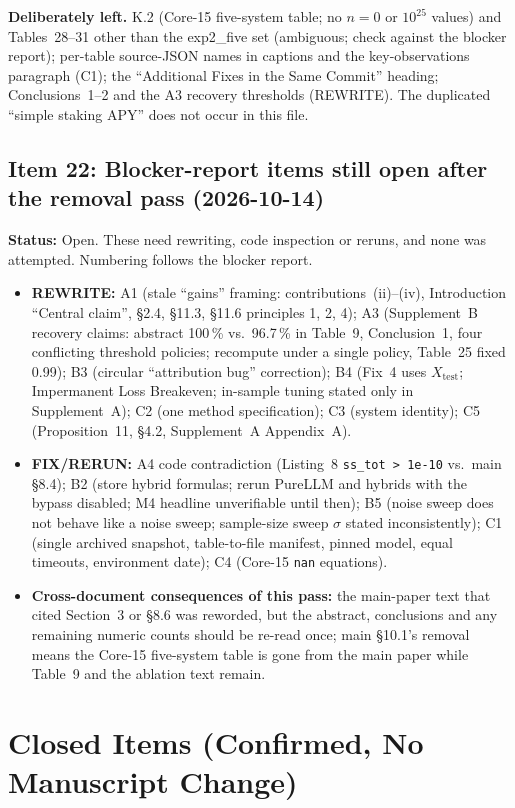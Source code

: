 \documentclass[11pt]{article}
\begin{document}
\textbf{Deliberately left.} K.2 (Core-15 five-system table; no $n{=}0$ or $10^{25}$ values) and Tables~28--31 other than the exp2\_five set (ambiguous; check against the blocker report); per-table source-JSON names in captions and the key-observations paragraph (C1);
the ``Additional Fixes in the Same Commit'' heading; Conclusions~1--2 and the A3 recovery thresholds (REWRITE). The duplicated ``simple staking APY'' does not occur in this file.

\subsection*{Item 22: Blocker-report items still open after the removal pass (2026-10-14)}
\textbf{Status:} Open. These need rewriting, code inspection or reruns, and none was attempted. Numbering follows the blocker report.
\begin{itemize}
  \item \textbf{REWRITE:} A1 (stale ``gains'' framing: contributions~(ii)--(iv), Introduction ``Central claim'', \S2.4, \S11.3, \S11.6 principles 1, 2, 4); A3 (Supplement~B recovery claims: abstract 100\,\% vs.\ 96.7\,\% in Table~9, Conclusion~1, four conflicting threshold policies; recompute under a single policy, Table~25 fixed 0.99);
  B3 (circular ``attribution bug'' correction); B4 (Fix~4 uses $X_{\text{test}}$; Impermanent Loss Breakeven; in-sample tuning stated only in Supplement~A); C2 (one method specification); C3 (system identity); C5 (Proposition~11, \S4.2, Supplement~A Appendix~A).
  \item \textbf{FIX/RERUN:} A4 code contradiction (Listing~8 \texttt{ss\_tot > 1e-10} vs.\ main \S8.4); B2 (store hybrid formulas; rerun PureLLM and hybrids with the bypass disabled; M4 headline unverifiable until then);
  B5 (noise sweep does not behave like a noise sweep; sample-size sweep $\sigma$ stated inconsistently); C1 (single archived snapshot, table-to-file manifest, pinned model, equal timeouts, environment date); C4 (Core-15 \texttt{nan} equations).
  \item \textbf{Cross-document consequences of this pass:} the main-paper text that cited Section~3 or \S8.6 was reworded, but the abstract, conclusions and any remaining numeric counts should be re-read once; main \S10.1's removal means the Core-15 five-system table is gone from the main paper while Table~9 and the ablation text remain.
\end{itemize}

\section{Closed Items (Confirmed, No Manuscript Change)}
\end{document}
